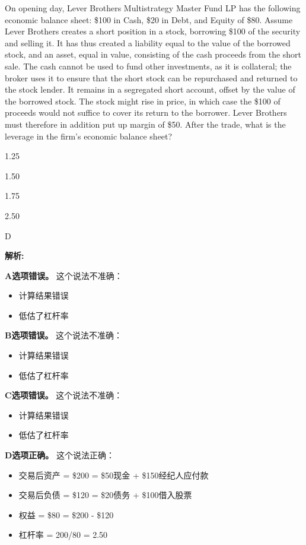 \documentclass{article}
\newcounter{question} %
\newenvironment{explanation}
{\textbf{解析:}\par}
{\par}
\begin{document}
\begin{question}
    On opening day, Lever Brothers Multistrategy Master Fund LP has the following economic balance sheet: \$100 in Cash, \$20 in Debt, and Equity of \$80. Assume Lever Brothers creates a short position in a stock, borrowing \$100 of the security and selling it. It has thus created a liability equal to the value of the borrowed stock, and an asset, equal in value, consisting of the cash proceeds from the short sale. The cash cannot be used to fund other investments, as it is collateral; the broker uses it to ensure that the short stock can be repurchased and returned to the stock lender. It remains in a segregated short account, offset by the value of the borrowed stock. The stock might rise in price, in which case the \$100 of proceeds would not suffice to cover its return to the borrower. Lever Brothers must therefore in addition put up margin of \$50. After the trade, what is the leverage in the firm's economic balance sheet?
\end{question}

\begin{choices}
    \item 1.25
    \item 1.50
    \item 1.75
    \item 2.50
\end{choices}

\begin{correctanswer}
    D
\end{correctanswer}

\begin{explanation}
    \textbf{A选项错误。}
    这个说法不准确：
    \begin{itemize}
        \item 计算结果错误
        \item 低估了杠杆率
    \end{itemize}

    \textbf{B选项错误。}
    这个说法不准确：
    \begin{itemize}
        \item 计算结果错误
        \item 低估了杠杆率
    \end{itemize}

    \textbf{C选项错误。}
    这个说法不准确：
    \begin{itemize}
        \item 计算结果错误
        \item 低估了杠杆率
    \end{itemize}

    \textbf{D选项正确。}
    这个说法正确：
    \begin{itemize}
        \item 交易后资产 = \$200 = \$50现金 + \$150经纪人应付款
        \item 交易后负债 = \$120 = \$20债务 + \$100借入股票
        \item 权益 = \$80 = \$200 - \$120
        \item 杠杆率 = 200/80 = 2.50
    \end{itemize}
\end{explanation}
\end{document}
